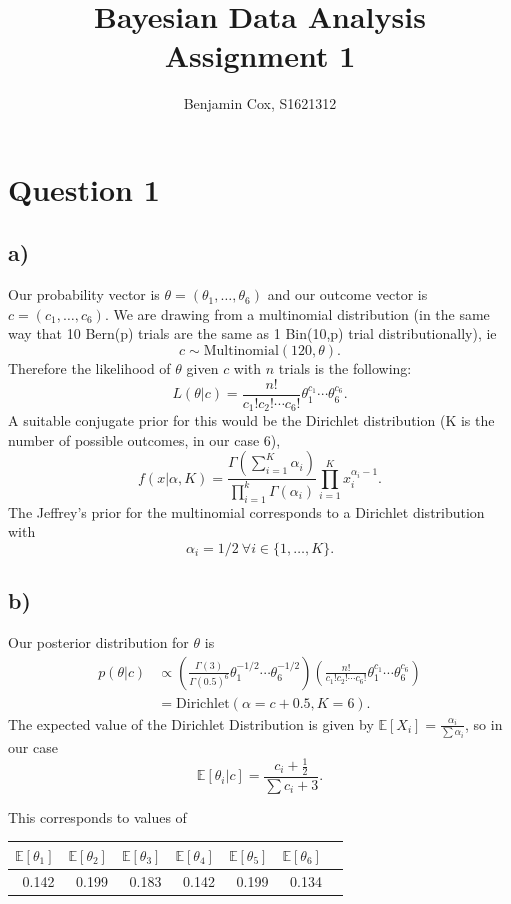 \documentclass[12pt]{extarticle}
\newcommand{\E}{\mathbb{E}}
\begin{document}
	
\title{Bayesian Data Analysis Assignment 1}
\author{Benjamin Cox, S1621312}
\date{\vspace{-5ex}}
\maketitle

\section*{Question 1}

\subsection*{a)}
Our probability vector is $\theta = (\theta_1, \dots, \theta_6)$ and our outcome vector is $c = (c_1, \dots, c_6).$ We are drawing from a multinomial distribution (in the same way that 10 Bern(p) trials are the same as 1 Bin(10,p) trial distributionally), ie $$c \sim \mathrm{Multinomial}(120, \theta).$$ Therefore the likelihood of $\theta$ given $c$ with $n$ trials is the following: $$L(\theta|c) = \frac{n!}{c_1!c_2!\cdots c_6!}\theta_1^{c_1}\cdots\theta_6^{c_6}.$$ A suitable conjugate prior for this would be the Dirichlet distribution (K is the number of possible outcomes, in our case 6), $$f(x| \alpha, K) = \frac{\Gamma(\sum_{i=1}^{K}\alpha_i)}{\prod_{i=1}^{k}\Gamma(\alpha_i)}\prod_{i=1}^{K}x_i^{\alpha_i-1}.$$
The Jeffrey's prior for the multinomial corresponds to a Dirichlet distribution with $$\alpha_i = 1/2\  \forall i\in \{1,\dots,K\}.$$

\subsection*{b)}
Our posterior distribution for $\theta$ is 
\begin{align*}
p(\theta|c) &\propto \left(\frac{\Gamma(3)}{\Gamma(0.5)^6}\theta_1^{-1/2}\cdots\theta_6^{-1/2}\right)\left(\frac{n!}{c_1!c_2!\cdots c_6!}\theta_1^{c_1}\cdots\theta_6^{c_6}\right)\\
&= \mathrm{Dirichlet}\left(\alpha = c+0.5, K = 6\right).
\end{align*}
The expected value of the Dirichlet Distribution is given by $\E\left[X_i\right] = \frac{\alpha_i}{\sum\alpha_i}$, so in our case $$\E\left[\theta_i|c\right] = \frac{c_i+\frac{1}{2}}{\sum c_i + 3}.$$

This corresponds to values of 
\begin{table}[H]
	\centering
	\begin{tabular}{rrrrrrr}
		\hline
		$\E\left[\theta_1\right]$ & $\E\left[\theta_2\right]$ & $\E\left[\theta_3\right]$ & $\E\left[\theta_4\right]$ & $\E\left[\theta_5\right]$ & $\E\left[\theta_6\right]$ \\ 
		\hline
		0.142 & 0.199 & 0.183 & 0.142 & 0.199 & 0.134 \\ 
		\hline
	\end{tabular}
\end{table}
\end{document}
